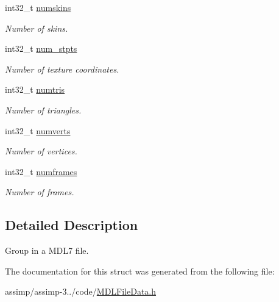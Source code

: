 \begin{DoxyCompactItemize}
\item 
\hypertarget{struct_assimp_1_1_m_d_l_1_1_group___m_d_l7_a16203d55ab7560ca5fc4a4d13dc6a416}{int32\+\_\+t \hyperlink{struct_assimp_1_1_m_d_l_1_1_group___m_d_l7_a16203d55ab7560ca5fc4a4d13dc6a416}{numskins}}\label{struct_assimp_1_1_m_d_l_1_1_group___m_d_l7_a16203d55ab7560ca5fc4a4d13dc6a416}

\begin{DoxyCompactList}\small\item\em Number of skins. \end{DoxyCompactList}\item 
\hypertarget{struct_assimp_1_1_m_d_l_1_1_group___m_d_l7_a0c75e67831f9795a3b78e14cb99e9de2}{int32\+\_\+t \hyperlink{struct_assimp_1_1_m_d_l_1_1_group___m_d_l7_a0c75e67831f9795a3b78e14cb99e9de2}{num\+\_\+stpts}}\label{struct_assimp_1_1_m_d_l_1_1_group___m_d_l7_a0c75e67831f9795a3b78e14cb99e9de2}

\begin{DoxyCompactList}\small\item\em Number of texture coordinates. \end{DoxyCompactList}\item 
\hypertarget{struct_assimp_1_1_m_d_l_1_1_group___m_d_l7_a47a3e3e06216abd50d9fbea0d30a6bdd}{int32\+\_\+t \hyperlink{struct_assimp_1_1_m_d_l_1_1_group___m_d_l7_a47a3e3e06216abd50d9fbea0d30a6bdd}{numtris}}\label{struct_assimp_1_1_m_d_l_1_1_group___m_d_l7_a47a3e3e06216abd50d9fbea0d30a6bdd}

\begin{DoxyCompactList}\small\item\em Number of triangles. \end{DoxyCompactList}\item 
\hypertarget{struct_assimp_1_1_m_d_l_1_1_group___m_d_l7_a56f92186e12e11a7519b988d3db5a8f1}{int32\+\_\+t \hyperlink{struct_assimp_1_1_m_d_l_1_1_group___m_d_l7_a56f92186e12e11a7519b988d3db5a8f1}{numverts}}\label{struct_assimp_1_1_m_d_l_1_1_group___m_d_l7_a56f92186e12e11a7519b988d3db5a8f1}

\begin{DoxyCompactList}\small\item\em Number of vertices. \end{DoxyCompactList}\item 
\hypertarget{struct_assimp_1_1_m_d_l_1_1_group___m_d_l7_ade9883ec2d4e55fd27ec19f615372631}{int32\+\_\+t \hyperlink{struct_assimp_1_1_m_d_l_1_1_group___m_d_l7_ade9883ec2d4e55fd27ec19f615372631}{numframes}}\label{struct_assimp_1_1_m_d_l_1_1_group___m_d_l7_ade9883ec2d4e55fd27ec19f615372631}

\begin{DoxyCompactList}\small\item\em Number of frames. \end{DoxyCompactList}\end{DoxyCompactItemize}


\subsection{Detailed Description}
Group in a M\+D\+L7 file. 

The documentation for this struct was generated from the following file\+:\begin{DoxyCompactItemize}
\item 
assimp/assimp-\/3../code/\hyperlink{_m_d_l_file_data_8h}{M\+D\+L\+File\+Data.\+h}\end{DoxyCompactItemize}
